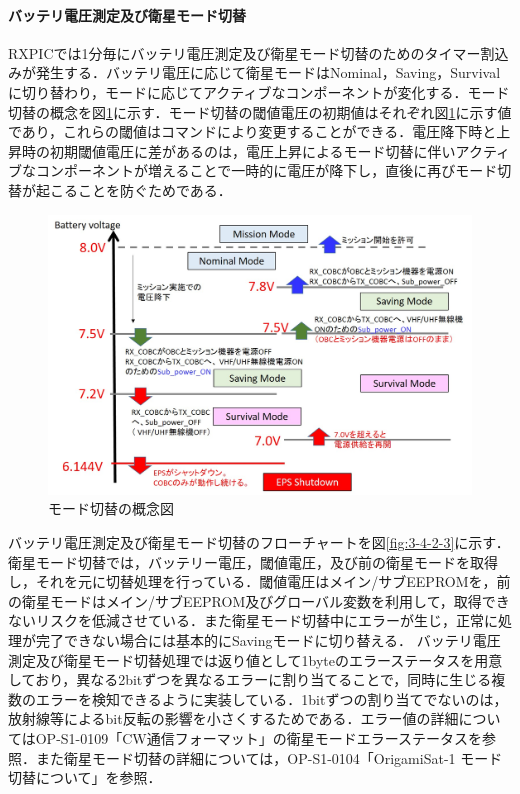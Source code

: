 \paragraph{バッテリ電圧測定及び衛星モード切替}
RXPICでは1分毎にバッテリ電圧測定及び衛星モード切替のためのタイマー割込みが発生する．バッテリ電圧に応じて衛星モードはNominal，Saving，Survivalに切り替わり，モードに応じてアクティブなコンポーネントが変化する．モード切替の概念を図\ref{fig:3-4-2-2}に示す．モード切替の閾値電圧の初期値はそれぞれ図\ref{fig:3-4-2-2}に示す値であり，これらの閾値はコマンドにより変更することができる．電圧降下時と上昇時の初期閾値電圧に差があるのは，電圧上昇によるモード切替に伴いアクティブなコンポーネントが増えることで一時的に電圧が降下し，直後に再びモード切替が起こることを防ぐためである．
\begin{figure}[H]
	\centering
	\includegraphics[scale=0.6]{03/fig/3-4-2-2.jpg}
	\caption{モード切替の概念図}
	\label{fig:3-4-2-2}
\end{figure}
バッテリ電圧測定及び衛星モード切替のフローチャートを図\ref{fig:3-4-2-3}に示す．
衛星モード切替では，バッテリー電圧，閾値電圧，及び前の衛星モードを取得し，それを元に切替処理を行っている．閾値電圧はメイン/サブEEPROMを，前の衛星モードはメイン/サブEEPROM及びグローバル変数を利用して，取得できないリスクを低減させている．また衛星モード切替中にエラーが生じ，正常に処理が完了できない場合には基本的にSavingモードに切り替える．
バッテリ電圧測定及び衛星モード切替処理では返り値として1byteのエラーステータスを用意しており，異なる2bitずつを異なるエラーに割り当てることで，同時に生じる複数のエラーを検知できるように実装している．1bitずつの割り当てでないのは，放射線等によるbit反転の影響を小さくするためである．エラー値の詳細についてはOP-S1-0109「CW通信フォーマット」の衛星モードエラーステータスを参照．また衛星モード切替の詳細については，OP-S1-0104「OrigamiSat-1 モード切替について」を参照．
